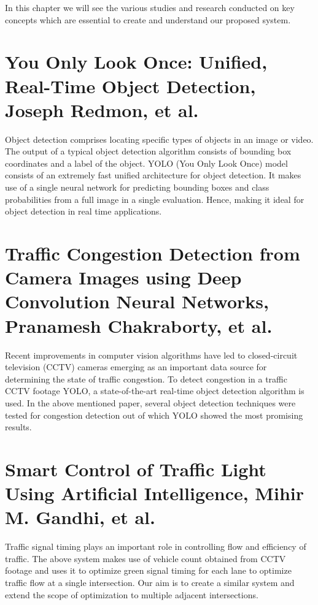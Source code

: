 \documentclass[openany,12pt]{report}
\begin{document}
\hspace*{0.5in}In this chapter we will see the various studies and research conducted on key concepts which are essential to create and understand our proposed system.

\section{You Only Look Once: Unified, Real-Time Object Detection, Joseph Redmon, et al. \cite{paper1}}
\hspace*{0.5in}Object detection comprises locating specific types of objects in an image or video. The output of a typical object detection algorithm consists of bounding box coordinates and a label of the object. YOLO (You Only Look Once) model consists of an extremely fast unified architecture for object detection. It makes use of a single neural network for predicting bounding boxes and class probabilities from a full image in a single evaluation. Hence, making it ideal for object detection in real time applications.\\

\section{Traffic Congestion Detection from Camera Images using Deep Convolution Neural Networks, Pranamesh Chakraborty, et al. \cite{paper2}}
\hspace*{0.5in}Recent improvements in computer vision algorithms have led to closed-circuit television (CCTV) cameras emerging as an important data source for determining the state of traffic congestion. To detect congestion in a traffic CCTV footage YOLO, a state-of-the-art real-time object detection algorithm is used. In the above mentioned paper, several object detection techniques were tested for congestion detection out of which YOLO showed the most promising results.\\

\section{Smart Control of Traffic Light Using Artificial Intelligence, Mihir M. Gandhi, et al. \cite{paper3}}
\hspace*{0.5in}Traffic signal timing plays an important role in controlling flow and efficiency of traffic.
The above system makes use of vehicle count obtained from CCTV footage and uses it to  optimize green signal timing for each lane to optimize traffic flow at a single intersection. Our aim is to create a similar system and extend the scope of optimization to multiple adjacent intersections.\\
\end{document}
